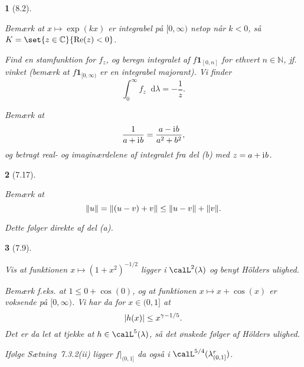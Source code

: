 \documentclass[a4paper, 11pt, article, danish, oneside]{memoir}
\newcommand{\naturals}{\mathbb{N}}
\newcommand{\complex}{\mathbb{C}}
\newcommand{\blank}{\mathrel{\;\cdot\;}}
\newcommand{\blankifempty}[1]{\ifstrempty{#1}{\blank}{#1}}
\DeclarePairedDelimiter{\auxdelimlvert}{\lvert}{\rvert}
\DeclarePairedDelimiter{\auxdelimlVert}{\lVert}{\rVert}
\newcommand{\abs}[2][]{\auxdelimlvert[#1]{\blankifempty{#2}}}
\newcommand{\norm}[1]{\auxdelimlVert{\blankifempty{#1}}}
\renewcommand{\Re}{\operatorname{Re}}
\newcommand{\dif}{\mathop{}\!\mathrm{d}}
\newcommand{\indicator}[1]{\mathbf{1}_{#1}}
\newcommand{\iu}{\mathrm{i}\mkern1mu}
\newcommand{\pencilsymbol}{\raisebox{-2pt}{\normalfont\PencilLeft}}
\theoremstyle{changedotcustomnumber}
\theoremstyle{changedotbreakcustomnumber}
\newtheorem{opgavebreak}{\pencilsymbol}
\begin{document}
\begin{opgavebreak}[8.2]
\begin{solutionsec}
    \item Bemærk at $x \mapsto \exp(kx)$ er integrabel på $[0,\infty)$ netop når $k < 0$, så $K = \set{z \in \complex}{\Re(z) < 0}$.

    \item Find en stamfunktion for $f_z$, og beregn integralet af $f \indicator{[0,n]}$ for ethvert $n \in \naturals$, jf. vinket (bemærk at $f \indicator{[0,\infty)}$ er en integrabel majorant). Vi finder
    \begin{equation*}
        \int_0^\infty f_z \dif\lambda
            = - \frac{1}{z}.
    \end{equation*}

    \item Bemærk at
    \begin{equation*}
        \frac{1}{a + \iu b}
            = \frac{a - \iu b}{a^2 + b^2},
    \end{equation*}
    og betragt real- og imaginærdelene af integralet fra del (b) med $z = a + \iu b$.
\end{solutionsec}
\end{opgavebreak}


\begin{opgavebreak}[7.17]
\begin{solutionsec}
    \item Bemærk at
    \begin{equation*}
        \norm{u}
            = \norm{(u - v) + v}
            \leq \norm{u - v} + \norm{v}.
    \end{equation*}

    \item Dette følger direkte af del (a).
\end{solutionsec}
\end{opgavebreak}


\begin{opgavebreak}[7.9]
\begin{solutionsec}
    \item Vis at funktionen $x \mapsto (1 + x^2)^{-1/2}$ ligger i $\calL^2(\lambda)$ og benyt Hölders ulighed.

    \item Bemærk f.eks. at $1 \leq 0 + \cos(0)$, og at funktionen $x \mapsto x + \cos(x)$ er voksende på $[0,\infty)$. Vi har da for $x \in (0,1]$ at
    \begin{equation*}
        \abs{h(x)}
            \leq x^{\gamma - 1/5}.
    \end{equation*}
    Det er da let at tjekke at $h \in \calL^5(\lambda)$, så det ønskede følger af Hölders ulighed.

    \item Ifølge Sætning~7.3.2(ii) ligger $f|_{(0,1]}$ da også i $\calL^{5/4}(\lambda^r_{(0,1]})$.
\end{solutionsec}
\end{opgavebreak}
\end{document}
